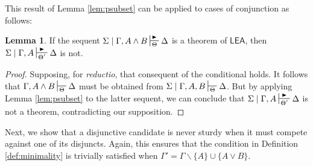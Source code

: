 \documentclass{article}
\theoremstyle{definition}
\theoremstyle{definition}
\theoremstyle{definition}
\newtheorem{lemma}{Lemma}
\theoremstyle{definition}
\theoremstyle{remark}
\theoremstyle{definition}
\theoremstyle{definition}
\begin{document}
This result of Lemma \ref{lem:psubset} can be applied to cases of conjunction as follows:

\begin{lemma}\label{lem:min_conj}
		If the sequent $ \Sigma\mid \Gamma, A\wedge B \sststile{\Theta}{\RHD} \Delta $ is a theorem of $ \mathsf{LEA}$, then  $ \Sigma\mid \Gamma, A \sststile{\Theta'}{\RHD} \Delta $ is not.
		
		\begin{proof}
			Supposing, for \textit{reductio}, that consequent of the conditional holds. It follows that $ \Gamma, A\wedge B \sststile{\Theta}{} \Delta $ must be obtained from $ \Sigma\mid \Gamma, A, B \sststile{\Theta}{} \Delta $.  But by applying Lemma \ref{lem:psubset} to the latter sequent, we can conclude that $ \Sigma\mid \Gamma, A \sststile{\Theta'}{\RHD} \Delta $ is not a theorem, contradicting our supposition.
		\end{proof}
		
\end{lemma}

Next, we show that a disjunctive candidate is never sturdy when it must compete against one of its disjuncts. Again, this ensures that the condition in Definition \ref{def:minimality} is trivially satisfied when $ \Gamma' = \Gamma\backslash\{A\}\cup\{A\vee B\}$.
\end{document}
